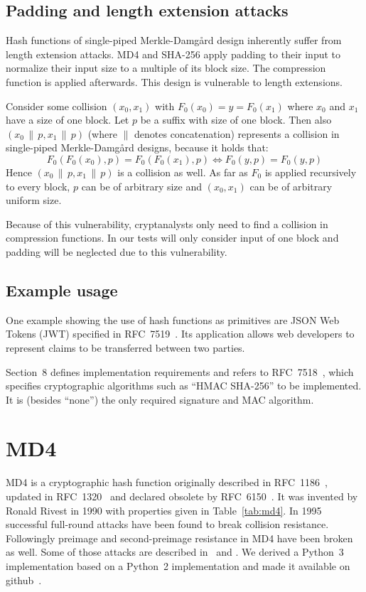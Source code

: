 \subsection{Padding and length extension attacks}
\label{sec:hash-length-ext-attack}
%
Hash functions of single-piped Merkle-Damg\aa{}rd design inherently suffer
from length extension attacks. MD4 and SHA-256 apply padding to their input
to normalize their input size to a multiple of its block size.
The compression function is applied afterwards. This design is vulnerable
to length extensions.

Consider some collision $(x_0, x_1)$ with $F_0(x_0) = y = F_0(x_1)$ where $x_0$ and
$x_1$ have a size of one block. Let $p$ be a suffix with size of one block.
Then also $(x_0 \,\|\, p, x_1 \,\|\, p)$ (where $\|$ denotes concatenation)
represents a collision in single-piped Merkle-Damg\aa{}rd designs, because
it holds that:
\[ F_0(F_0(x_0), p) = F_0(F_0(x_1), p) \iff F_0(y, p) = F_0(y, p) \]
Hence $(x_0 \,\|\, p, x_1 \,\|\, p)$ is a collision as well.
As far as $F_0$ is applied recursively to every block, $p$ can be of arbitrary size
and $(x_0, x_1)$ can be of arbitrary uniform size.

Because of this vulnerability, cryptanalysts only need to find a collision
in compression functions. In our tests will only consider input of one block
and padding will be neglected due to this vulnerability.

\subsection{Example usage}
\label{sec:hash-usage}
%
One example showing the use of hash functions as primitives are JSON Web Tokens (JWT)
specified in RFC~7519~\cite{rfc7519}. Its application allows web developers to
represent claims to be transferred between two parties.

Section~8 defines implementation requirements and refers to RFC~7518~\cite{rfc7518},
which specifies cryptographic algorithms such as \enquote{HMAC SHA-256} to be
implemented. It is (besides \enquote{none}) the only required signature and MAC algorithm.

\section{MD4}
\label{sec:dc-md4}
%
MD4 is a cryptographic hash function originally described in RFC~1186~\cite{rfc1186},
updated in RFC~1320~\cite{rfc1320} and declared obsolete by RFC~6150~\cite{rfc6150}. It was
invented by Ronald Rivest in 1990 with properties given in Table~\ref{tab:md4}.
In 1995~\cite{Dobbertin1998} successful full-round attacks have been found to break collision resistance.
Followingly preimage and second-preimage resistance in MD4 have been broken as well.
Some of those attacks are described in~\cite{md4-2007} and \cite{cryptoeprint:2005:151}.
We derived a Python~3 implementation based on a Python~2 implementation
and made it available on github~\cite{md4-py3k}.

